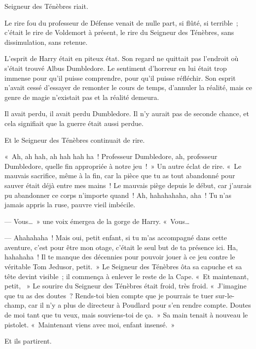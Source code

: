 
 Seigneur des Ténèbres riait.

\hplettrineextrapara
Le rire fou du professeur de Défense venait de nulle part, si flûté, si terrible~; c'était le rire de Voldemort à présent, le rire du Seigneur des Ténèbres, sans dissimulation, sans retenue.

L'esprit de Harry était en piteux état. Son regard ne quittait pas l'endroit où s'était trouvé Albus Dumbledore. Le sentiment d'horreur en lui était trop immense pour qu'il puisse comprendre, pour qu'il puisse réfléchir. Son esprit n'avait cessé d'essayer de remonter le cours de temps, d'annuler la réalité, mais ce genre de magie n'existait pas et la réalité demeura.

Il avait perdu, il avait perdu Dumbledore. Il n'y aurait pas de seconde chance, et cela signifiait que la guerre était aussi perdue.

Et le Seigneur des Ténèbres continuait de rire.

«~Ah, ah hah, ah hah hah ha~! Professeur Dumbledore, ah, professeur Dumbledore, quelle fin appropriée à notre jeu~!~» Un autre éclat de rire. «~Le mauvais sacrifice, même à la fin, car la pièce que tu as tout abandonné pour sauver était déjà entre mes mains~! Le mauvais piège depuis le début, car j'aurais pu abandonner ce corps n'importe quand~! Ah, hahahahaha, aha~! Tu n'as jamais appris la ruse, pauvre vieil imbécile.

--- Vous…~» une voix émergea de la gorge de Harry. «~Vous…

--- Ahahahaha~! Mais oui, petit enfant, si tu m'as accompagné dans cette aventure, c'est pour être mon otage, c'était le seul but de ta présence ici. Ha, hahahaha~! Il te manque des décennies pour pouvoir jouer à ce jeu contre le véritable Tom Jedusor, petit.~» Le Seigneur des Ténèbres ôta sa capuche et sa tête devint visible~; il commença à enlever le reste de la Cape. «~Et maintenant, petit, ~» Le sourire du Seigneur des Ténèbres était froid, très froid. «~J'imagine que tu as des doutes~? Rends-toi bien compte que je pourrais te tuer sur-le-champ, car il n'y a plus de directeur à Poudlard pour s'en rendre compte. Doutes de moi tant que tu veux, mais souviens-toi de ça.~» Sa main tenait à nouveau le pistolet. «~Maintenant viens avec moi, enfant insensé.~»

Et ils partirent.

